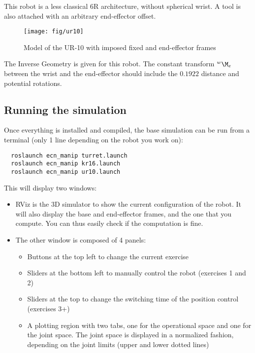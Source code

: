 \documentclass{ecnreport}
\begin{document}
  This robot is a less classical 6R architecture, without spherical wrist. A tool is also attached with an arbitrary end-effector offset.
  
  \begin{figure}[h!]\centering
    \texttt{[image: fig/ur10]}
    \caption{Model of the UR-10 with imposed fixed and end-effector frames}
  \end{figure}
  
  The Inverse Geometry is given for this robot. 
  The constant transform $\wMe$ between the wrist and the end-effector should include the $0.1922$ distance and potential rotations.
  
  
  \newpage
  \subsection{Running the simulation}
  
  Once everything is installed and compiled, the base simulation can be run from a terminal (only 1 line depending on the robot you work on):
  \cppstyle
  \begin{lstlisting}
  roslaunch ecn_manip turret.launch
  roslaunch ecn_manip kr16.launch
  roslaunch ecn_manip ur10.launch
  \end{lstlisting}
  
  This will display two windows:
  \begin{itemize}
    \item RViz is the 3D simulator to show the current configuration of the robot. It will also display the base and end-effector frames, and the one that you compute. You can thus easily check if the computation is fine.
    \item The other window is composed of 4 panels:
    \begin{itemize}
      \item Buttons at the top left to change the current exercise
      \item Sliders at the bottom left to manually control the robot (exercises 1 and 2)
      \item Sliders at the top to change the switching time of the position control (exercises 3+)
      \item A plotting region with two tabs, one for the operational space and one for the joint space. The joint space is displayed in a normalized fashion, depending on the joint limits (upper and lower dotted lines)
    \end{itemize}
  \end{itemize}
  
\end{document}
